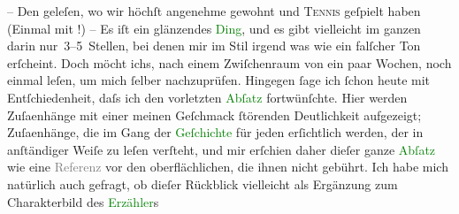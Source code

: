 \pstart
           – Den \label{K_L03005-6v}\label{K_L03005-6h} geleſen, wo wir höchſt angenehme \label{K_L03005-7v}\label{K_L03005-7h}{ }{\pb}gewohnt und \textsc{Tennis}
               geſpielt haben (Einmal mit \label{K_L03005-8v}\label{K_L03005-8h}!) – Es iſt ein glänzendes \textcolor{green}{Ding}{}\ledrightnote{{$\rightarrow$}\textcolor{green}{Herr Wenzel auf Rehberg. Novelle}}, und es gibt vielleicht im ganzen darin nur 3–5 Stellen, bei denen mir
               im Stil irgend was wie ein falſcher Ton erſcheint. Doch möcht ichs, nach einem
               Zwiſchenraum von ein paar Wochen, noch einmal leſen, um mich ſelber nachzuprüfen.
               Hingegen ſage ich ſchon heute mit Entſchiedenheit,
               daſs ich den vorletzten \textcolor{green}{Abſatz}{}\ledrightnote{{$\rightarrow$}\textcolor{green}{Herr Wenzel auf Rehberg. Novelle}}
               fortwünſchte. Hier werden Zuſa{\geminationm}enhänge mit einer meinen
               Geſchmack ſtörenden Deutlichkeit aufgezeigt; 
                  Zuſa{\geminationm}enhänge, die im {\pb}Gang der \textcolor{green}{Geſchichte}{}\ledrightnote{{$\rightarrow$}\textcolor{green}{Herr Wenzel auf Rehberg. Novelle}}{ } für jeden erſichtlich werden, der in
               anſtändiger Weiſe zu leſen verſteht, und mir erſchien daher dieſer ganze \textcolor{green}{Abſatz}{}\ledrightnote{{$\rightarrow$}\textcolor{green}{Herr Wenzel auf Rehberg. Novelle}} wie eine
                  \textcolor{gray}{Referenz} vor den oberflächlichen, die ihnen nicht gebührt. Ich
               habe mich natürlich auch gefragt, ob dieſer Rückblick vielleicht als Ergänzung zum
               Charakterbild des \textcolor{green}{Erzähler}{}\ledrightnote{{$\rightarrow$}\textcolor{green}{Herr Wenzel auf Rehberg. Novelle}}s
